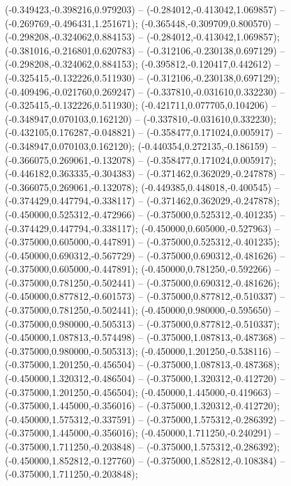  (-0.349423,-0.398216,0.979203) -- (-0.284012,-0.413042,1.069857) -- (-0.269769,-0.496431,1.251671);
 (-0.365448,-0.309709,0.800570) -- (-0.298208,-0.324062,0.884153) -- (-0.284012,-0.413042,1.069857);
 (-0.381016,-0.216801,0.620783) -- (-0.312106,-0.230138,0.697129) -- (-0.298208,-0.324062,0.884153);
 (-0.395812,-0.120417,0.442612) -- (-0.325415,-0.132226,0.511930) -- (-0.312106,-0.230138,0.697129);
 (-0.409496,-0.021760,0.269247) -- (-0.337810,-0.031610,0.332230) -- (-0.325415,-0.132226,0.511930);
 (-0.421711,0.077705,0.104206) -- (-0.348947,0.070103,0.162120) -- (-0.337810,-0.031610,0.332230);
 (-0.432105,0.176287,-0.048821) -- (-0.358477,0.171024,0.005917) -- (-0.348947,0.070103,0.162120);
 (-0.440354,0.272135,-0.186159) -- (-0.366075,0.269061,-0.132078) -- (-0.358477,0.171024,0.005917);
 (-0.446182,0.363335,-0.304383) -- (-0.371462,0.362029,-0.247878) -- (-0.366075,0.269061,-0.132078);
 (-0.449385,0.448018,-0.400545) -- (-0.374429,0.447794,-0.338117) -- (-0.371462,0.362029,-0.247878);
 (-0.450000,0.525312,-0.472966) -- (-0.375000,0.525312,-0.401235) -- (-0.374429,0.447794,-0.338117);
 (-0.450000,0.605000,-0.527963) -- (-0.375000,0.605000,-0.447891) -- (-0.375000,0.525312,-0.401235);
 (-0.450000,0.690312,-0.567729) -- (-0.375000,0.690312,-0.481626) -- (-0.375000,0.605000,-0.447891);
 (-0.450000,0.781250,-0.592266) -- (-0.375000,0.781250,-0.502441) -- (-0.375000,0.690312,-0.481626);
 (-0.450000,0.877812,-0.601573) -- (-0.375000,0.877812,-0.510337) -- (-0.375000,0.781250,-0.502441);
 (-0.450000,0.980000,-0.595650) -- (-0.375000,0.980000,-0.505313) -- (-0.375000,0.877812,-0.510337);
 (-0.450000,1.087813,-0.574498) -- (-0.375000,1.087813,-0.487368) -- (-0.375000,0.980000,-0.505313);
 (-0.450000,1.201250,-0.538116) -- (-0.375000,1.201250,-0.456504) -- (-0.375000,1.087813,-0.487368);
 (-0.450000,1.320312,-0.486504) -- (-0.375000,1.320312,-0.412720) -- (-0.375000,1.201250,-0.456504);
 (-0.450000,1.445000,-0.419663) -- (-0.375000,1.445000,-0.356016) -- (-0.375000,1.320312,-0.412720);
 (-0.450000,1.575312,-0.337591) -- (-0.375000,1.575312,-0.286392) -- (-0.375000,1.445000,-0.356016);
 (-0.450000,1.711250,-0.240291) -- (-0.375000,1.711250,-0.203848) -- (-0.375000,1.575312,-0.286392);
 (-0.450000,1.852812,-0.127760) -- (-0.375000,1.852812,-0.108384) -- (-0.375000,1.711250,-0.203848);
